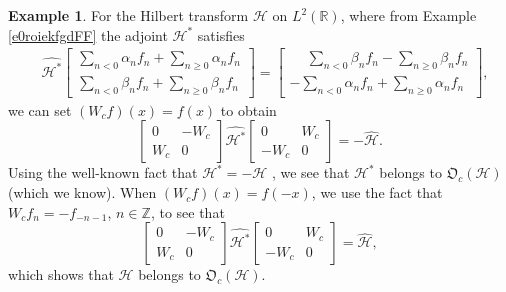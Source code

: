 \documentclass{dis}
\theoremstyle{plain}
\theoremstyle{definition}
\newtheorem{Example}[equation]{Example}
\def\R{\mathbb{R}}
\def\Z{\mathbb{Z}}
\renewcommand{\geq}{\geqslant}
\newcommand{\0}{{\color{lightgray}0}}
\begin{document}
\begin{Example}\label{HTwlkdfj77YY}
For the Hilbert transform $\mathscr{H}$ on $L^2(\R)$, where from Example \ref{e0roiekfgdFF} the adjoint $\mathscr{H}^{*}$ satisfies 
\begin{align*}
& \widehat{\mathscr{H}^{*}} \begin{bmatrix} \sum_{n < 0} \alpha_{n} f_{n} + \sum_{n \geq 0} \alpha_n f_n \\ \sum_{n < 0} \beta_n f_n + \sum_{n \geq 0} \beta_n f_n \end{bmatrix}
 = \begin{bmatrix} \phantom{-} \sum_{n < 0} \beta_n f_n - \sum_{n \geq 0} \beta_n f_n \\ -\sum_{n < 0} \alpha_n f_n + \sum_{n \geq 0} \alpha_n f_n\end{bmatrix},
\end{align*}
we can set $(W_{c} f)(x) = f(x)$ to obtain 
$$\begin{bmatrix} 0 & -W_{c}\\W_{c} & 0\end{bmatrix} \widehat{\mathscr{H}^{*}} \begin{bmatrix} 0 & W_{c}\\ -W_{c} & 0\end{bmatrix} = - \widehat{\mathscr{H}}.$$
Using the well-known fact that $\mathscr{H}^{*} = - \mathscr{H}$ \cite[p.~278]{MR4545809}, we see that $\mathscr{H}^{*}$  belongs to $\mathfrak{O}_c(\mathscr{H})$ (which we know). When $(W_{c} f)(x) = f(-x)$, we use the fact that $W_{c} f_{n} = - f_{-n - 1}$, $n \in \Z$, to see that 
$$\begin{bmatrix} 0 & -W_{c}\\W_{c} & 0\end{bmatrix} \widehat{\mathscr{H}^{*}} \begin{bmatrix} 0 & W_{c}\\ -W_{c} & 0\end{bmatrix} =  \widehat{\mathscr{H}},$$
which shows that $\mathscr{H}$ belongs to $\mathfrak{O}_c(\mathscr{H})$. 
\end{Example}




\end{document}
